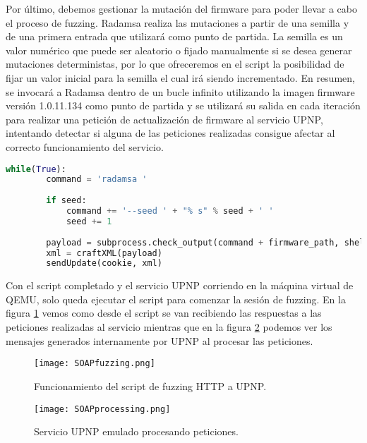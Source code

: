 Por último, debemos gestionar la mutación del firmware para poder llevar a cabo el proceso de fuzzing. Radamsa realiza las 
mutaciones a partir de una semilla y de una primera entrada que utilizará como punto de partida. La semilla es un valor numérico 
que puede ser aleatorio o fijado manualmente si se desea generar mutaciones deterministas, por lo que ofreceremos en 
el script la posibilidad de fijar un valor inicial para la semilla el cual irá siendo incrementado. En resumen, se invocará
a Radamsa dentro de un bucle infinito utilizando la imagen firmware versión 1.0.11.134 como punto de partida y se utilizará 
su salida en cada iteración para realizar una petición de actualización de firmware al servicio UPNP, intentando 
detectar si alguna de las peticiones realizadas consigue afectar al correcto funcionamiento del servicio.

\begin{lstlisting}[language=python, caption=Integración con Radamsa para mutación de entradas., captionpos=b,
    frame=single, breaklines, showstringspaces=false]
    while(True):
        command = 'radamsa '
        
        if seed:
            command += '--seed ' + "% s" % seed + ' '
            seed += 1
        
        payload = subprocess.check_output(command + firmware_path, shell=True)
        xml = craftXML(payload)
        sendUpdate(cookie, xml)
\end{lstlisting}

Con el script completado y el servicio UPNP corriendo en la máquina virtual de QEMU, solo queda ejecutar el script para 
comenzar la sesión de fuzzing. En la figura \ref{fig:SOAPfuzzing} vemos como desde el script se van recibiendo las respuestas a las peticiones 
realizadas al servicio mientras que en la figura \ref{fig:SOAPprocessing} podemos ver los mensajes generados internamente por
UPNP al procesar las peticiones.

\begin{figure}[H]
    \centering
    \texttt{[image: SOAPfuzzing.png]}
    \caption{Funcionamiento del script de fuzzing HTTP a UPNP.}
    \label{fig:SOAPfuzzing}
\end{figure}

\begin{figure}[H]
    \centering
    \texttt{[image: SOAPprocessing.png]}
    \caption{Servicio UPNP emulado procesando peticiones.}
    \label{fig:SOAPprocessing}
\end{figure}

